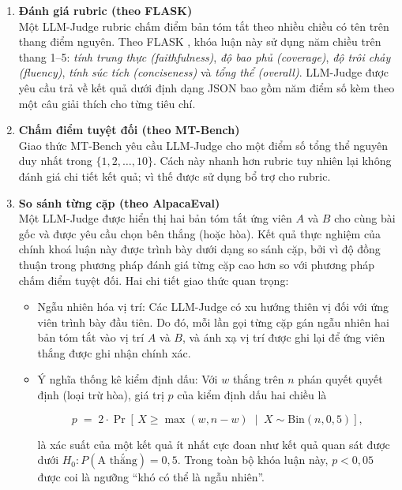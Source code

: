 \begin{enumerate}[label=(\alph*), leftmargin=*]

    \item \textbf{Đánh giá rubric (theo FLASK)} \\
    Một LLM-Judge rubric chấm điểm bản tóm tắt theo nhiều chiều có tên trên thang điểm nguyên. Theo FLASK \cite{Ye2023}, khóa luận này sử dụng năm chiều trên thang 1--5: \textit{tính trung thực (faithfulness)}, \textit{độ bao phủ (coverage)}, \textit{độ trôi chảy (fluency)}, \textit{tính súc tích (conciseness)} và \textit{tổng thể (overall)}. LLM-Judge được yêu cầu trả về kết quả dưới định dạng JSON bao gồm năm điểm số kèm theo một câu giải thích cho từng tiêu chí.

    \item \textbf{Chấm điểm tuyệt đối (theo MT-Bench)} \\
    Giao thức MT-Bench \cite{Zheng2023} yêu cầu LLM-Judge cho một điểm số tổng thể nguyên duy nhất trong $\{1,2,\ldots,10\}$. Cách này nhanh hơn rubric tuy nhiên lại không đánh giá chi tiết kết quả; vì thế được sử dụng bổ trợ cho rubric.

    \item \textbf{So sánh từng cặp (theo AlpacaEval)} \\
    Một LLM-Judge được hiển thị hai bản tóm tắt ứng viên $A$ và $B$ cho cùng bài gốc và được yêu cầu chọn bên thắng (hoặc hòa). Kết quả thực nghiệm của chính khoá luận này được trình bày dưới dạng so sánh cặp, bởi vì độ đồng thuận trong phương pháp đánh giá từng cặp cao hơn so với phương pháp chấm điểm tuyệt đối. Hai chi tiết giao thức quan trọng:

    \begin{itemize}
        \item Ngẫu nhiên hóa vị trí: Các LLM-Judge có xu hướng thiên vị đối với ứng viên trình bày đầu tiên. Do đó, mỗi lần gọi từng cặp gán ngẫu nhiên hai bản tóm tắt vào vị trí $A$ và $B$, và ánh xạ vị trí được ghi lại để ứng viên thắng được ghi nhận chính xác.
        \item Ý nghĩa thống kê kiểm định dấu: Với $w$ thắng trên $n$ phán quyết quyết định (loại trừ hòa), giá trị $p$ của kiểm định dấu hai chiều là

        $$p \;=\; 2 \cdot \Pr\!\left[\,X \geq \max(w, n - w) \;\mid\; X \sim \text{Bin}(n, 0{,}5)\right],$$

        \noindent là xác suất của một kết quả ít nhất cực đoan như kết quả quan sát được dưới $H_0: P(\text{A thắng}) = 0{,}5$. Trong toàn bộ khóa luận này, $p < 0{,}05$ được coi là ngưỡng ``khó có thể là ngẫu nhiên''.
    \end{itemize}


\end{enumerate}

